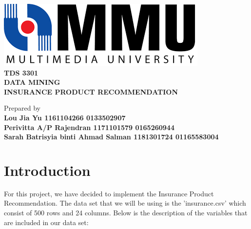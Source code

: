 \documentclass[11pt]{article}
\begin{document}
\begin{center}

\includegraphics[scale=0.52]{mmu_logo.png}\\
\vspace{1.0cm}
\Large{\textbf{TDS 3301 \\DATA MINING}} \\
\vspace{1.5cm}
\Large{\textbf{INSURANCE PRODUCT RECOMMENDATION}} \\
\vspace{1cm}
 


\vspace{6.cm}
\normalsize{Prepared by} \\
\vspace{2.5cm}
\large{\textbf{Lou Jia Yu 1161104266 0133502907}} \\ 
\large{\textbf{Perivitta A/P Rajendran 1171101579 0165260944}} \\ 
\large{\textbf{Sarah Batrisyia binti Ahmad Salman 1181301724 01165583004}} \\ 

\end{center}

\thispagestyle{empty}
 
\clearpage 


\section{Introduction}
\textrm{\hspace{1cm}For this project, we have decided to implement the Insurance Product Recommendation. The data set that we will be using is the 'insurance.csv' which consist of 500 rows and 24 columns. Below is the description of the variables that are included in our data set: }
\end{document}

